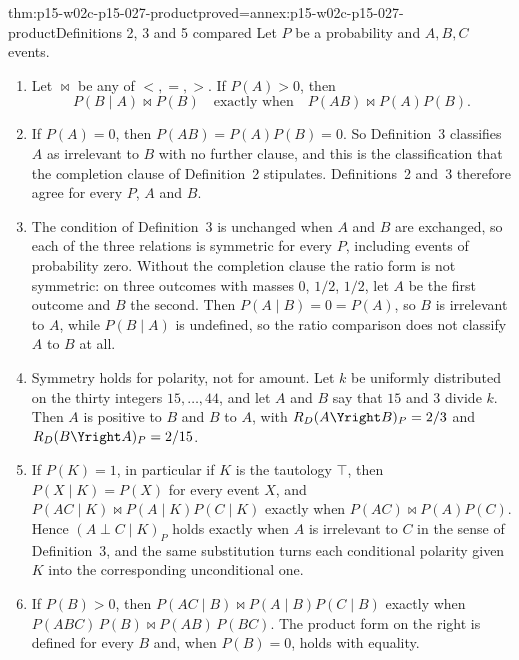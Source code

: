 \begin{hbtheorem}{thm:p15-w02c-p15-027-product}{proved=annex:p15-w02c-p15-027-product}{Definitions 2, 3 and 5 compared}
Let \(P\) be a probability and \(A,B,C\) events.
\begin{enumerate}
\item Let \(\bowtie\) be any of \(<,=,>\). If \(P(A)>0\), then
  \[
   P(B\mid A)\bowtie P(B)\quad\text{exactly when}\quad
   P(AB)\bowtie P(A)P(B).
  \]
\item If \(P(A)=0\), then \(P(AB)=P(A)P(B)=0\). So Definition~3
  classifies \(A\) as irrelevant to \(B\) with no further clause, and
  this is the classification that the completion clause of
  Definition~2 stipulates. Definitions~2 and~3 therefore agree for every
  \(P\), \(A\) and \(B\).
\item The condition of Definition~3 is unchanged when \(A\) and \(B\) are
  exchanged, so each of the three relations is symmetric for every
  \(P\), including events of probability zero. Without the completion
  clause the ratio form is not symmetric: on three outcomes with masses
  \(0\), \(1/2\), \(1/2\), let \(A\) be the first outcome and \(B\) the
  second. Then \(P(A\mid B)=0=P(A)\), so \(B\) is irrelevant to \(A\),
  while \(P(B\mid A)\) is undefined, so the ratio comparison does not
  classify \(A\) to \(B\) at all.
\item Symmetry holds for polarity, not for amount. Let \(k\) be uniformly
  distributed on the thirty integers \(15,\ldots,44\), and let \(A\) and
  \(B\) say that \(15\) and \(3\) divide \(k\). Then \(A\) is positive to
  \(B\) and \(B\) to \(A\), with
  \(R_D(A\Yright B)_P=2/3\) and \(R_D(B\Yright A)_P=2/15\).
\item If \(P(K)=1\), in particular if \(K\) is the tautology \(\top\),
  then \(P(X\mid K)=P(X)\) for every event \(X\), and
  \(P(AC\mid K)\bowtie P(A\mid K)P(C\mid K)\) exactly when
  \(P(AC)\bowtie P(A)P(C)\). Hence \((A\perp C\mid K)_P\) holds exactly
  when \(A\) is irrelevant to \(C\) in the sense of Definition~3, and
  the same substitution turns each conditional polarity given \(K\) into
  the corresponding unconditional one.
\item If \(P(B)>0\), then \(P(AC\mid B)\bowtie P(A\mid B)P(C\mid B)\)
  exactly when \(P(ABC)\,P(B)\bowtie P(AB)\,P(BC)\). The product form on
  the right is defined for every \(B\) and, when \(P(B)=0\), holds with
  equality.
\end{enumerate}
\end{hbtheorem}

